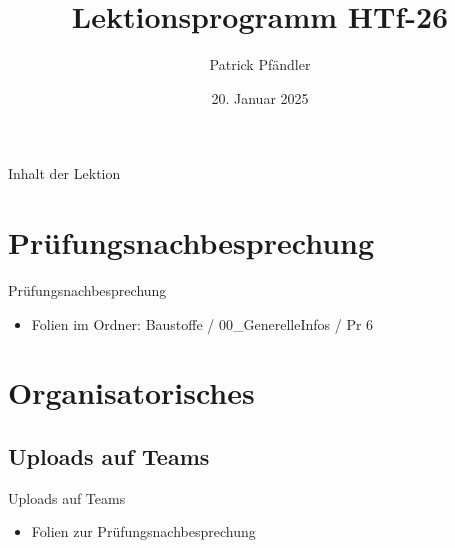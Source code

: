 \def\customoptions{aspectratio=169} %



\title{\textbf{Lektionsprogramm HTf-26}}
\author{Patrick Pfändler}
\date{20. Januar 2025}




\frame{\titlepage}

\begin{frame}{Inhalt der Lektion}
    \tableofcontents
\end{frame}



\section{Prüfungsnachbesprechung}
\BlueSectionSlide
\begin{frame}{Prüfungsnachbesprechung}
    \begin{itemize}
        \item[\textbullet] Folien im Ordner: Baustoffe /  00\_GenerelleInfos / Pr 6
    \end{itemize}

\end{frame}





\section{Organisatorisches}
\BlueSectionSlide

\subsection{Uploads auf Teams}
\begin{frame}{Uploads auf Teams}
    \begin{itemize}
        \item[\textbullet] Folien zur Prüfungsnachbesprechung
    \end{itemize}

\end{frame}



